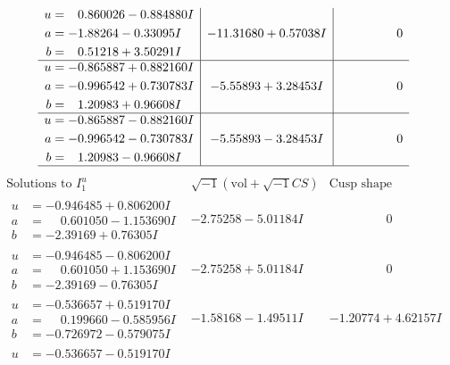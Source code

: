 \documentclass[1p]{elsarticle_modified}
\theoremstyle{definition}
\newcommand{\I}{\sqrt{-1}}
\begin{document}
$$\begin{array}{c|c|c}
\begin{aligned}
u &= \phantom{-}0.860026 - 0.884880 I \\
a &= -1.88264 - 0.33095 I \\
b &= \phantom{-}0.51218 + 3.50291 I\end{aligned}
 & -11.31680 + 0.57038 I & \phantom{-0.000000 } 0 \\ \hline\begin{aligned}
u &= -0.865887 + 0.882160 I \\
a &= -0.996542 + 0.730783 I \\
b &= \phantom{-}1.20983 + 0.96608 I\end{aligned}
 & -5.55893 + 3.28453 I & \phantom{-0.000000 } 0 \\ \hline\begin{aligned}
u &= -0.865887 - 0.882160 I \\
a &= -0.996542 - 0.730783 I \\
b &= \phantom{-}1.20983 - 0.96608 I\end{aligned}
 & -5.55893 - 3.28453 I & \phantom{-0.000000 } 0\\
 \hline 
 \end{array}$$\newpage$$\begin{array}{c|c|c}  
\text{Solutions to }I^u_{1}& \I (\text{vol} + \sqrt{-1}CS) & \text{Cusp shape}\\
 \hline 
\begin{aligned}
u &= -0.946485 + 0.806200 I \\
a &= \phantom{-}0.601050 - 1.153690 I \\
b &= -2.39169 + 0.76305 I\end{aligned}
 & -2.75258 - 5.01184 I & \phantom{-0.000000 } 0 \\ \hline\begin{aligned}
u &= -0.946485 - 0.806200 I \\
a &= \phantom{-}0.601050 + 1.153690 I \\
b &= -2.39169 - 0.76305 I\end{aligned}
 & -2.75258 + 5.01184 I & \phantom{-0.000000 } 0 \\ \hline\begin{aligned}
u &= -0.536657 + 0.519170 I \\
a &= \phantom{-}0.199660 - 0.585956 I \\
b &= -0.726972 - 0.579075 I\end{aligned}
 & -1.58168 - 1.49511 I & -1.20774 + 4.62157 I \\ \hline\begin{aligned}
u &= -0.536657 - 0.519170 I \\

\end{aligned}
\end{array}$$
\end{document}
